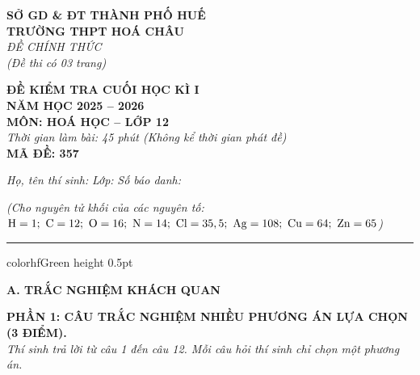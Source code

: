 \documentclass[11pt,a4paper]{article}
\begin{document}
\begin{minipage}[t]{0.48\textwidth}
\textbf{SỞ GD \& ĐT THÀNH PHỐ HUẾ}\\
\textbf{TRƯỜNG THPT HOÁ CHÂU}\\
\textit{ĐỀ CHÍNH THỨC}\\
\textit{(Đề thi có 03 trang)}
\end{minipage}
\hfill
\begin{minipage}[t]{0.48\textwidth}
\raggedleft
\textbf{\color{hfRed}ĐỀ KIỂM TRA CUỐI HỌC KÌ I}\\
\textbf{NĂM HỌC 2025 -- 2026}\\
\textbf{MÔN: HOÁ HỌC -- LỚP 12}\\
\textit{Thời gian làm bài: 45 phút (Không kể thời gian phát đề)}\\
\textbf{MÃ ĐỀ: 357}
\end{minipage}

\vspace{4pt}
\noindent
\textit{Họ, tên thí sinh:} \dotfill \textit{Lớp:} \dotfill \textit{Số báo danh:} \dotfill

\vspace{3pt}
\noindent
\textit{\footnotesize (Cho nguyên tử khối của các nguyên tố: $\ce{H}=1;\ \ce{C}=12;\ \ce{O}=16;\ \ce{N}=14;\ \ce{Cl}=35,5;\ \ce{Ag}=108;\ \ce{Cu}=64;\ \ce{Zn}=65$)}

\vspace{3pt}
\hrule color{hfGreen} height 0.5pt

\vspace{4pt}
\noindent
{\color{mainGreen}\textbf{\Large A. TRẮC NGHIỆM KHÁCH QUAN}}

\vspace{3pt}
\noindent
{\color{mainGreen}\textbf{\large PHẦN 1: CÂU TRẮC NGHIỆM NHIỀU PHƯƠNG ÁN LỰA CHỌN (3 ĐIỂM).}}\\
\textit{\small Thí sinh trả lời từ câu 1 đến câu 12. Mỗi câu hỏi thí sinh chỉ chọn một phương án.}
\vspace{2pt}
\end{document}
